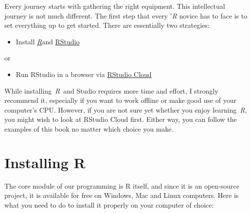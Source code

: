 \documentclass[
]{book}
\providecommand{\tightlist}{%
  \setlength{\itemsep}{0pt}\setlength{\parskip}{0pt}}
\begin{document}
Every journey starts with gathering the right equipment. This intellectual journey is not much different. The first step that every '\emph{R} novice has to face is to set everything up to get started. There are essentially two strategies:

\begin{itemize}
\tightlist
\item
  Install \href{https://www.r-project.org}{\emph{R}}and \href{https://www.rstudio.com}{RStudio}
\end{itemize}

or

\begin{itemize}
\tightlist
\item
  Run RStudio in a browser via \href{https://rstudio.cloud}{RStudio Cloud}
\end{itemize}

While installing~\emph{R}~and Studio requires more time and effort, I strongly recommend it, especially if you want to work offline or make good use of your computer's CPU. However, if you are not sure yet whether you enjoy learning~\emph{R}, you might wish to look at RStudio Cloud first. Either way, you can follow the examples of this book no matter which choice you make.

\hypertarget{installing-r}{%
\section{Installing R}\label{installing-r}}

The core module of our programming is R itself, and since it is an open-source project, it is available for free on Windows, Mac and Linux computers. Here is what you need to do to install it properly on your computer of choice:
\end{document}
